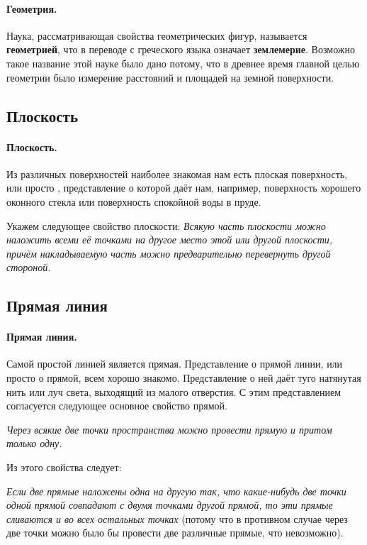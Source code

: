 \documentclass[twoside]{book}
\begin{document}
\paragraph{Геометрия.}\label{1938/2}
Наука, рассматривающая свойства геометрических фигур, называется \textbf{геометрией}, что в переводе с греческого языка означает \textbf{землемерие}.
Возможно такое название этой науке было дано потому, что в древнее время главной целью геометрии было измерение расстояний и площадей на земной поверхности. 


\subsection*{Плоскость}

\paragraph{Плоскость.}\label{1938/3}
Из различных поверхностей наиболее знакомая нам есть плоская поверхность, или просто , представление о которой даёт нам, например, поверхность хорошего оконного стекла или поверхность спокойной воды в пруде.

Укажем следующее свойство плоскости:
\textit{Всякую часть плоскости можно наложить всеми её точками на другое место этой или другой плоскости, причём накладываемую часть можно предварительно перевернуть другой стороной.}

\subsection*{Прямая линия}

\paragraph{Прямая линия.}\label{1938/4}
Самой простой линией является прямая.
Представление о прямой линии, или просто о прямой, всем хорошо знакомо.
Представление о ней даёт туго натянутая нить или луч света, выходящий из малого отверстия.
С этим представлением согласуется следующее основное свойство прямой.

\textit{Через всякие две точки пространства можно провести прямую и притом только одну.}

Из этого свойства следует:

\textit{Если две прямые наложены одна на другую так, что какие-нибудь две точки одной прямой совпадают с двумя точками другой прямой, то эти прямые сливаются и во всех остальных точках} (потому что в противном случае через две точки можно было бы провести две различные прямые, что невозможно).
\end{document}
